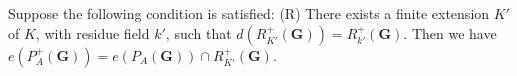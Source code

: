 Suppose the following condition is satisfied:
(R) There exists a finite extension $K'$ of $K$, with residue field $k'$, such that $d(R_{K'}^+(\mathbf{G})) = R_{k'}^+(\mathbf{G})$.
Then we have $e(P_A^+(\mathbf{G})) = e(P_A(\mathbf{G})) \cap R_{K'}^+(\mathbf{G})$.
